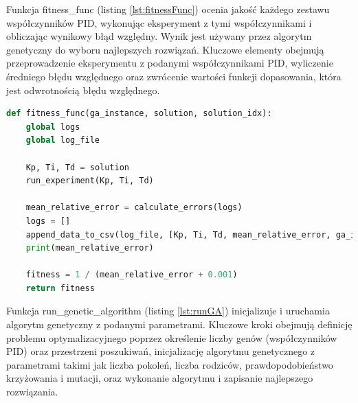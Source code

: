 \documentclass[12pt,twoside]{article}
\begin{document}
Funkcja fitness\_func (listing \ref{lst:fitnessFunc}) ocenia jakość każdego zestawu współczynników PID, wykonując eksperyment z tymi współczynnikami i obliczając wynikowy błąd względny. Wynik jest używany przez algorytm genetyczny do wyboru najlepszych rozwiązań. Kluczowe elementy obejmują przeprowadzenie eksperymentu z podanymi współczynnikami PID, wyliczenie średniego błędu względnego oraz zwrócenie wartości funkcji dopasowania, która jest odwrotnością błędu względnego.

\begin{lstlisting}[language=Python, caption=Funkcja dopasowania, label={lst:fitnessFunc}]
def fitness_func(ga_instance, solution, solution_idx):
    global logs
    global log_file

    Kp, Ti, Td = solution
    run_experiment(Kp, Ti, Td)

    mean_relative_error = calculate_errors(logs)
    logs = []
    append_data_to_csv(log_file, [Kp, Ti, Td, mean_relative_error, ga_instance.generations_completed])
    print(mean_relative_error)

    fitness = 1 / (mean_relative_error + 0.001)
    return fitness
\end{lstlisting}

Funkcja run\_genetic\_algorithm (listing \ref{lst:runGA}) inicjalizuje i uruchamia algorytm genetyczny z podanymi parametrami. Kluczowe kroki obejmują definicję problemu optymalizacyjnego poprzez określenie liczby genów (współczynników PID) oraz przestrzeni poszukiwań, inicjalizację algorytmu genetycznego z parametrami takimi jak liczba pokoleń, liczba rodziców, prawdopodobieństwo krzyżowania i mutacji, oraz wykonanie algorytmu i zapisanie najlepszego rozwiązania.
\end{document}
